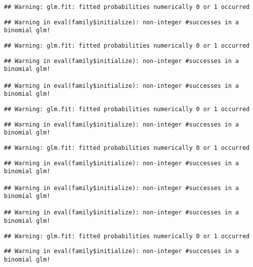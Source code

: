 \documentclass[
]{article}
\begin{document}
\begin{verbatim}
## Warning: glm.fit: fitted probabilities numerically 0 or 1 occurred
\end{verbatim}

\begin{verbatim}
## Warning in eval(family$initialize): non-integer #successes in a binomial glm!
\end{verbatim}

\begin{verbatim}
## Warning: glm.fit: fitted probabilities numerically 0 or 1 occurred
\end{verbatim}

\begin{verbatim}
## Warning in eval(family$initialize): non-integer #successes in a binomial glm!

## Warning in eval(family$initialize): non-integer #successes in a binomial glm!
\end{verbatim}

\begin{verbatim}
## Warning: glm.fit: fitted probabilities numerically 0 or 1 occurred
\end{verbatim}

\begin{verbatim}
## Warning in eval(family$initialize): non-integer #successes in a binomial glm!
\end{verbatim}

\begin{verbatim}
## Warning: glm.fit: fitted probabilities numerically 0 or 1 occurred
\end{verbatim}

\begin{verbatim}
## Warning in eval(family$initialize): non-integer #successes in a binomial glm!

## Warning in eval(family$initialize): non-integer #successes in a binomial glm!

## Warning in eval(family$initialize): non-integer #successes in a binomial glm!
\end{verbatim}

\begin{verbatim}
## Warning: glm.fit: fitted probabilities numerically 0 or 1 occurred
\end{verbatim}

\begin{verbatim}
## Warning in eval(family$initialize): non-integer #successes in a binomial glm!
\end{verbatim}
\end{document}
